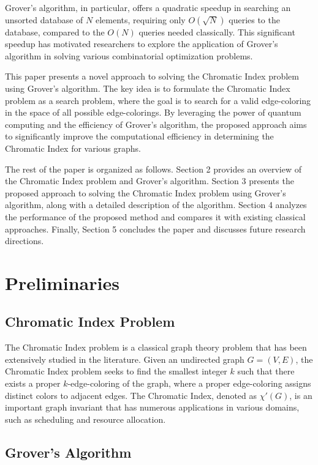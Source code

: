 Grover's algorithm, in particular, offers a quadratic speedup in searching an unsorted database of $N$ elements, requiring only $O(\sqrt{N})$ queries to the database, compared to the $O(N)$ queries needed classically. This significant speedup has motivated researchers to explore the application of Grover's algorithm in solving various combinatorial optimization problems.

This paper presents a novel approach to solving the Chromatic Index problem using Grover's algorithm. The key idea is to formulate the Chromatic Index problem as a search problem, where the goal is to search for a valid edge-coloring in the space of all possible edge-colorings. By leveraging the power of quantum computing and the efficiency of Grover's algorithm, the proposed approach aims to significantly improve the computational efficiency in determining the Chromatic Index for various graphs.

The rest of the paper is organized as follows. Section 2 provides an overview of the Chromatic Index problem and Grover's algorithm. Section 3 presents the proposed approach to solving the Chromatic Index problem using Grover's algorithm, along with a detailed description of the algorithm. Section 4 analyzes the performance of the proposed method and compares it with existing classical approaches. Finally, Section 5 concludes the paper and discusses future research directions.

\section{Preliminaries}

\subsection{Chromatic Index Problem}

The Chromatic Index problem is a classical graph theory problem that has been extensively studied in the literature. Given an undirected graph $G = (V, E)$, the Chromatic Index problem seeks to find the smallest integer $k$ such that there exists a proper $k$-edge-coloring of the graph, where a proper edge-coloring assigns distinct colors to adjacent edges. The Chromatic Index, denoted as $\chi'(G)$, is an important graph invariant that has numerous applications in various domains, such as scheduling and resource allocation.

\subsection{Grover's Algorithm}

